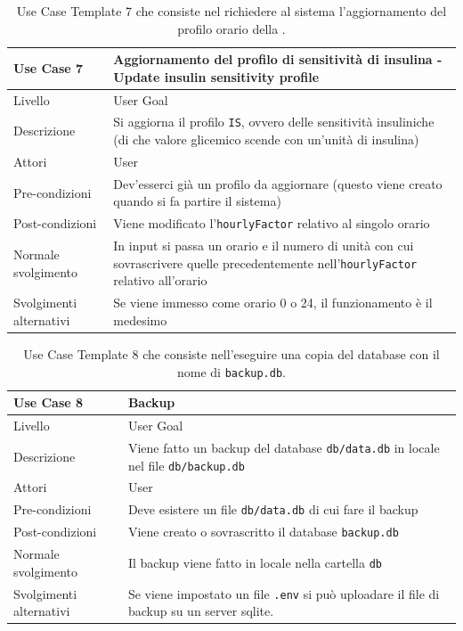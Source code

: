 \documentclass[twocolumn]{article}
\begin{document}
\begin{table}
    \centering
    \captionsetup{justification=centering}
    \begin{tabular}{|p{4.5cm}|p{9.5cm}|}
        \hline
        Use Case 7 & Aggiornamento del profilo di sensitività di insulina - Update insulin sensitivity profile\\
        \hline
        Livello & User Goal \\
        \hline
        Descrizione & Si aggiorna il profilo \texttt{IS}, ovvero delle sensitività insuliniche (di che valore glicemico scende con un'unità di insulina)\\
        \hline
        Attori & User \\
        \hline
        Pre-condizioni & Dev'esserci già un profilo da aggiornare (questo viene creato quando si fa partire il sistema)\\
        \hline
        Post-condizioni & Viene modificato l'\texttt{hourlyFactor} relativo al singolo orario\\
        \hline
        Normale svolgimento & In input si passa un orario e il numero di unità con cui sovrascrivere quelle precedentemente nell'\texttt{hourlyFactor} relativo all'orario\\
        \hline
        Svolgimenti alternativi & Se viene immesso come orario 0 o 24, il funzionamento è il medesimo\\
        \hline
    \end{tabular}
    \caption{Use Case Template 7 che consiste nel richiedere al sistema l'aggiornamento del profilo orario della .}
    \label{tab:uc7}
\end{table}

\begin{table}[!htbp]
    \centering
    \captionsetup{justification=centering}
    \begin{tabular}{|p{4.5cm}|p{9.5cm}|}
        \hline
        Use Case 8 & Backup\\
        \hline
        Livello & User Goal \\
        \hline
        Descrizione & Viene fatto un backup del database \texttt{db/data.db} in locale nel file \texttt{db/backup.db}\\
        \hline
        Attori & User \\
        \hline
        Pre-condizioni & Deve esistere un file \texttt{db/data.db} di cui fare il backup\\
        \hline
        Post-condizioni & Viene creato o sovrascritto il database \texttt{backup.db}\\
        \hline
        Normale svolgimento & Il backup viene fatto in locale nella cartella \texttt{db}\\
        \hline
        Svolgimenti alternativi & Se viene impostato un file \texttt{.env} si può uploadare il file di backup su un server sqlite.\\
        \hline
    \end{tabular}
    \caption{Use Case Template 8 che consiste nell'eseguire una copia del database con il nome di \texttt{backup.db}.}
    \label{tab:uc8}
\end{table}
\end{document}
